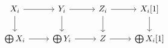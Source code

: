\documentclass[12pt]{standalone}
\begin{document}
        $$

\begin{tikzcd}
    X_i \ar[r] \ar[d] & Y_i \ar[r] \ar[d] & Z_i \ar[r] \ar[d] & X_i[1] \ar[d] \\
    \bigoplus X_i \ar[r] & \bigoplus Y_i \ar[r] & Z \ar[r] & \bigoplus X_i[1]
\end{tikzcd}
        $$
        
\end{document}

